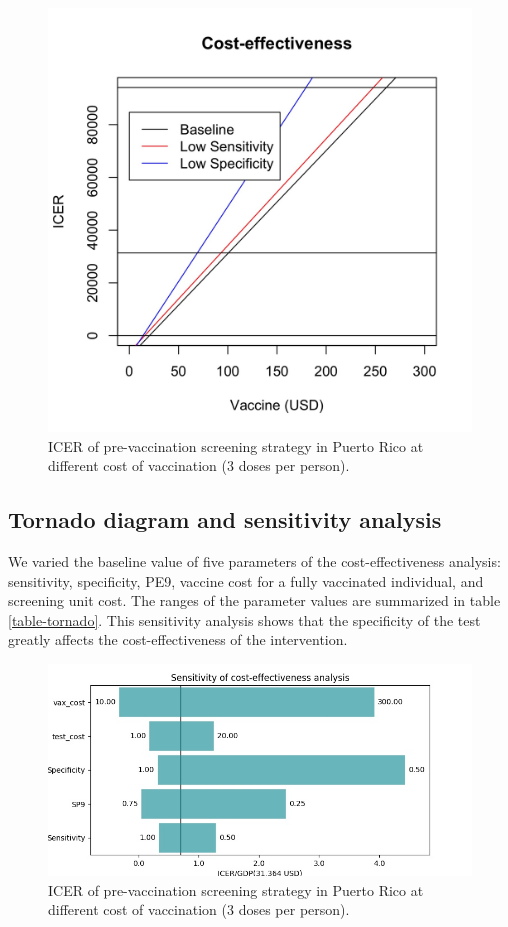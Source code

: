 \documentclass[12pt]{article}\usepackage[]{graphicx}\usepackage[]{color}
\begin{document}
\begin{figure}[H]
  \centering
  \includegraphics[width=.7\linewidth]{../analysis/figures/report_figure_ICER.jpeg}
  \caption{ICER of pre-vaccination screening strategy in Puerto Rico at different cost of vaccination (3 doses per person).}
  \label{fig-ICER}
\end{figure}

\subsection{Tornado diagram and sensitivity analysis}
We varied the baseline value of five parameters of the cost-effectiveness analysis: sensitivity, specificity, PE9, vaccine cost for a fully vaccinated individual, and screening unit cost. The ranges of the parameter values are summarized in table \ref{table-tornado}. This sensitivity analysis shows that the specificity of the test greatly affects the cost-effectiveness of the intervention. 

\begin{figure}[H]
  \centering \includegraphics[width=.8\linewidth]{../analysis/figures/report_figure_tornado_diagram.jpeg}
  \caption{ICER of pre-vaccination screening strategy in Puerto Rico at different cost of vaccination (3 doses per person).}
  \label{fig-tornado}
\end{figure}
\end{document}
